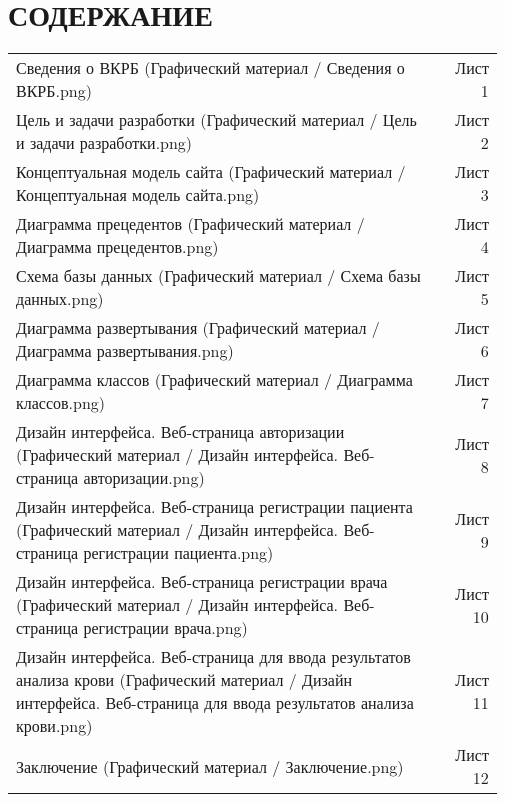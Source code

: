 \newpage
\section*{СОДЕРЖАНИЕ}
\tableofcontents
{\parindent0pt
	

\begin{xltabular}{\linewidth}{@{}p{0.85\linewidth}r{0.124\linewidth}}
Сведения о ВКРБ (Графический материал / Сведения о ВКРБ.png) & Лист 1\\

Цель и задачи разработки (Графический материал / Цель
и задачи разработки.png) & Лист 2\\

Концептуальная модель сайта (Графический материал / Концептуальная модель сайта.png) & Лист 3\\

Диаграмма прецедентов (Графический материал / Диаграмма прецедентов.png) & Лист 4\\

Схема базы данных (Графический материал / Схема базы данных.png) & Лист 5\\

Диаграмма развертывания (Графический материал / Диаграмма развертывания.png) & Лист 6\\

Диаграмма классов (Графический материал / Диаграмма классов.png) & Лист 7\\

Дизайн интерфейса. Веб-страница авторизации (Графический материал / Дизайн интерфейса. Веб-страница авторизации.png) & Лист 8\\

Дизайн интерфейса. Веб-страница регистрации пациента (Графический материал / Дизайн интерфейса. Веб-страница регистрации пациента.png) & Лист 9\\

Дизайн интерфейса. Веб-страница регистрации врача (Графический материал / Дизайн интерфейса. Веб-страница регистрации врача.png) & Лист 10\\

Дизайн интерфейса. Веб-страница для ввода результатов анализа крови (Графический материал / Дизайн интерфейса. Веб-страница для ввода результатов анализа крови.png) & Лист 11\\

Заключение (Графический материал / Заключение.png) & Лист 12\\
\end{xltabular}
}
